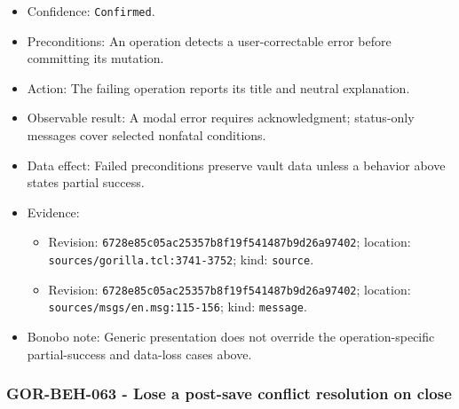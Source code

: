 \documentclass[
  letterpaper,
]{article}
\newcommand{\passthrough}[1]{#1}
\providecommand{\tightlist}{%
  \setlength{\itemsep}{0pt}\setlength{\parskip}{0pt}}
\begin{document}
\begin{itemize}
\tightlist
\item
  Confidence: \passthrough{\lstinline!Confirmed!}.
\item
  Preconditions: An operation detects a user-correctable error before committing its mutation.
\item
  Action: The failing operation reports its title and neutral explanation.
\item
  Observable result: A modal error requires acknowledgment; status-only messages cover selected nonfatal conditions.
\item
  Data effect: Failed preconditions preserve vault data unless a behavior above states partial success.
\item
  Evidence:

  \begin{itemize}
  \tightlist
  \item
    Revision: \nolinkurl{6728e85c05ac25357b8f19f541487b9d26a97402}; location: \nolinkurl{sources/gorilla.tcl:3741-3752};
    kind: \passthrough{\lstinline!source!}.
  \item
    Revision: \nolinkurl{6728e85c05ac25357b8f19f541487b9d26a97402}; location: \nolinkurl{sources/msgs/en.msg:115-156};
    kind: \passthrough{\lstinline!message!}.
  \end{itemize}
\item
  Bonobo note: Generic presentation does not override the operation-specific partial-success and data-loss cases above.
\end{itemize}

\subsubsection{GOR-BEH-063 - Lose a post-save conflict resolution on
close}\label{gor-beh-063---lose-a-post-save-conflict-resolution-on-close}
\end{document}
